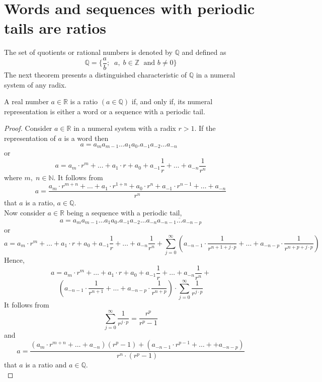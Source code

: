\documentclass[color=black,11pt]{elegantpaper}
\begin{document}
\section{Words and sequences with periodic tails are ratios}
\label{sec:ratio_are}
The set of quotients or rational numbers is denoted by $\mathbb{Q}$ and defined as
$$
\mathbb{Q} = \{ \frac{a}{b};\;\;a,\;b \in \mathbb{Z}\;\mbox{ and } b\not= 0 \}
$$
The next theorem presents a distinguished characteristic of $\mathbb{Q}$ in a numeral system of any radix. 
\begin{theorem}
A real number $a \in \mathbb{R}$ is a ratio $(a \in \mathbb{Q})$ if, and only if, its numeral representation is either a word or a sequence with a periodic tail. 
\end{theorem}
\begin{proof}
Consider $a \in \mathbb{R}$ in a numeral system with a radix $r>1.$ If the representation of $a$ is a word then
$$
a = a_m a_{m-1} \dots a_1 a_0 . a_{-1}a_{-2}\dots a_{-n}\;\;
$$
or
$$
a = a_m\cdot r^m+\dots+a_1 \cdot r + a_0 + a_{-1} \frac{1}{r}+\dots + a_{-n} \frac{1}{r^n}
$$
where $m,\;n \in \mathbb{N}.$ It follows from 
$$
a= \frac{a_m\cdot r^{m+n}+\dots+a_1 \cdot r^{1+n} + a_0 \cdot r^n + a_{-1}\cdot r^{n-1}+\dots + a_{-n}}{r^n} 
$$ 
that $a$ is a ratio,  $a \in \mathbb{Q}.$\\

Now consider $a \in \mathbb{R}$ being a sequence with a periodic tail, 
$$
a = a_m a_{m-1} \dots a_1 a_0 . a_{-1}a_{-2}\dots a_{-n}\overline{a_{-n-1} \dots a_{-n-p} }
$$
or
$$
a = a_m\cdot r^m+\dots+a_1 \cdot r + a_0 + a_{-1} \frac{1}{r}+\dots + a_{-n} \frac{1}{r^n}+\sum_{j=0}^{\infty} (a_{-n-1}\cdot \frac{1}{r^{n+1+j\cdot p}}+ \dots +a_{-n-p}\cdot \frac{1}{r^{n+p+j\cdot p}} )
$$
Hence,
$$
a = a_m\cdot r^m+\dots+a_1 \cdot r + a_0 + a_{-1} \frac{1}{r}+\dots + a_{-n} \frac{1}{r^n}+
$$
$$
(a_{-n-1}\cdot \frac{1}{r^{n+1}}+ \dots +a_{-n-p}\cdot \frac{1}{r^{n+p}} ) \cdot \sum_{j=0}^{\infty}\frac{1}{r^{j\cdot p}}
$$
It follows from 
$$
\sum_{j=0}^{\infty}\frac{1}{r^{j\cdot p}} = \frac{r^p}{r^p-1}
$$
and
$$
a = \frac{(a_m\cdot r^{m+n}+\dots + a_{-n} )(r^p-1)+(a_{-n-1}\cdot r^{p-1}+\dots + +a_{-n-p} )}{r^{n} \cdot (r^p-1) }
$$
that $a$ is a ratio and $a \in \mathbb{Q}.$\\


\end{proof}
\end{document}
